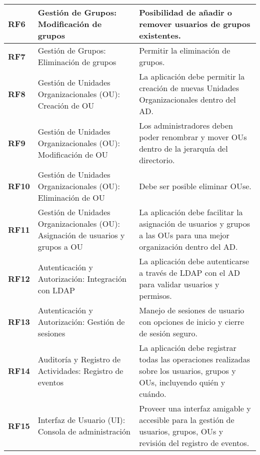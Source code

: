 \begin{longtable}{|l|p{5cm}|p{8.5cm}|}
    \textbf{RF6}   & Gestión de Grupos: Modificación de grupos                                       & Posibilidad de añadir o remover usuarios de grupos existentes.                                                             \\ \hline
    \textbf{RF7}   & Gestión de Grupos: Eliminación de grupos                                        & Permitir la eliminación de grupos.                                                                                         \\ \hline
    \textbf{RF8}   & Gestión de Unidades Organizacionales (OU): Creación de OU                       & La aplicación debe permitir la creación de nuevas Unidades Organizacionales dentro del AD.                                 \\ \hline
    \textbf{RF9}   & Gestión de Unidades Organizacionales (OU): Modificación de OU                   & Los administradores deben poder renombrar y mover OUs dentro de la jerarquía del directorio.                               \\ \hline
    \textbf{RF10}  & Gestión de Unidades Organizacionales (OU): Eliminación de OU                    & Debe ser posible eliminar OUse.                                                                                            \\ \hline
    \textbf{RF11}  & Gestión de Unidades Organizacionales (OU): Asignación de usuarios y grupos a OU & La aplicación debe facilitar la asignación de usuarios y grupos a las OUs para una mejor organización dentro del AD.       \\ \hline
    \textbf{RF12}  & Autenticación y Autorización: Integración con LDAP                              & La aplicación debe autenticarse a través de LDAP con el AD para validar usuarios y permisos.                               \\ \hline
    \textbf{RF13}  & Autenticación y Autorización: Gestión de sesiones                               & Manejo de sesiones de usuario con opciones de inicio y cierre de sesión seguro.                                            \\ \hline
    \textbf{RF14}  & Auditoría y Registro de Actividades: Registro de eventos                        & La aplicación debe registrar todas las operaciones realizadas sobre los usuarios, grupos y OUs, incluyendo quién y cuándo. \\ \hline
    \textbf{RF15}  & Interfaz de Usuario (UI): Consola de administración                             & Proveer una interfaz amigable y accesible para la gestión de usuarios, grupos, OUs y revisión del registro de eventos.     \\ \hline

\end{longtable}
